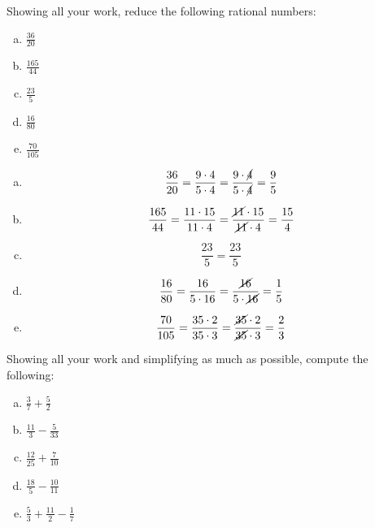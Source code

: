 \documentclass[11pt,letterpaper]{article}
\begin{document}

 Showing all your work, reduce the following rational numbers:
	\begin{enumerate}[(a)]
	\item $\frac{36}{20}$
	\item $\frac{165}{44}$
	\item $\frac{23}{5}$
	\item $\frac{16}{80}$
	\item $\frac{70}{105}$
	\end{enumerate} \pspace

\sol 
\begin{enumerate}[(a)]
\item 
	\[
	\dfrac{36}{20}= \dfrac{9 \cdot 4}{5 \cdot 4}= \dfrac{9 \cdot \cancel{4}}{5 \cdot \cancel{4}}= \dfrac{9}{5}
	\] \pspace

\item 
	\[
	\dfrac{165}{44}= \dfrac{11 \cdot 15}{11 \cdot 4}= \dfrac{\cancel{11} \cdot 15}{\cancel{11} \cdot 4}= \dfrac{15}{4}
	\] \pspace
 
\item 
	\[
	\dfrac{23}{5}= \dfrac{23}{5}
	\] \pspace

\item 
	\[
	\dfrac{16}{80}= \dfrac{16}{5 \cdot 16}= \dfrac{\cancel{16}}{5 \cdot \cancel{16}}= \dfrac{1}{5}
	\] \pspace

\item 
	\[
	\dfrac{70}{105}= \dfrac{35 \cdot 2}{35 \cdot 3}= \dfrac{\cancel{35} \cdot 2}{\cancel{35} \cdot 3}= \dfrac{2}{3}
	\]
\end{enumerate}



\newpage



 Showing all your work and simplifying as much as possible, compute the following:
	\begin{enumerate}[(a)]
	\item $\frac{3}{7} + \frac{5}{2}$
	\item $\frac{11}{3}  - \frac{5}{33}$
	\item $\frac{12}{25} + \frac{7}{10}$
	\item $\frac{18}{5} - \frac{10}{11}$
	\item $\frac{5}{3} + \frac{11}{2} - \frac{1}{7}$
	\end{enumerate} \pspace
\end{document}
